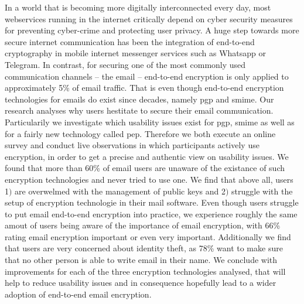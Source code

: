 
In a world that is becoming more digitally interconnected every day, most
webservices running in the internet critically depend on cyber security measures for preventing cyber-crime and protecting user privacy. A huge step towards more secure internet communication has been the integration of end-to-end cryptography in mobile internet messenger services such as Whatsapp or Telegram. In contrast, for securing one of the most commonly used communication channels -- the \acrlong{email} -- end-to-end encryption is only applied to approximately 5\% of email traffic. That is even though end-to-end encryption technologies for \acrshort{email}s do exist since decades, namely \acrfull{pgp} and \acrfull{smime}. Our research analyses why users hestitate to secure their \acrshort{email} communication. Particularily we investigate which usability issues exist for \acrshort{pgp}, \acrshort{smime} as well as for a fairly new technology called \acrfull{pep}. Therefore we both execute an online survey and conduct live observations in which participants actively use encryption, in order to get a precise and authentic view on usability issues.
\newline
We found that more than 60\% of \acrshort{email} users are unaware of the existance of such encryption technologies and never tried to use one. We find that above all, users 1$)$ are overwelmed with the management of public keys and 2$)$ struggle with the setup of encryption technologie in their mail software. Even though users struggle to put \acrshort{email} end-to-end encryption into practice, we experience roughly the same amout of users being aware of the importance of \acrshort{email} encryption, with 66\% rating email encryption important or even very important. Additionally we find that users are very concerned about identity theft, as 78\% want to make sure that no other person is able to write email in their name. We conclude with improvements for each of the three encryption technologies analysed, that will help to reduce usability issues and in consequence hopefully lead to a wider adoption of end-to-end \acrshort{email} encryption.